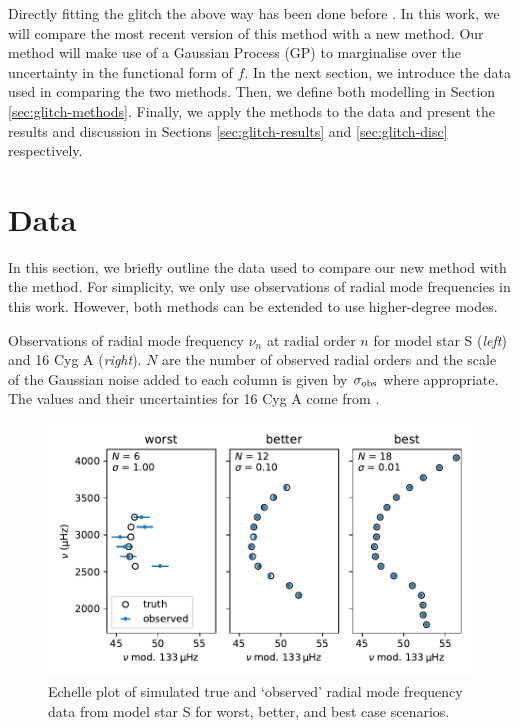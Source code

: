 
Directly fitting the glitch the above way has been done before \citep[e.g.][]{Verma.Faria.ea2014,Verma.Raodeo.ea2017,Mazumdar.Monteiro.ea2014}. In this work, we will compare the most recent version of this method \citep[][hereafter V19]{Verma.Raodeo.ea2019} with a new method. Our method will make use of a Gaussian Process (GP) to marginalise over the uncertainty in the functional form of \(f\). In the next section, we introduce the data used in comparing the two methods. Then, we define both modelling in Section \ref{sec:glitch-methods}. Finally, we apply the methods to the data and present the results and discussion in Sections \ref{sec:glitch-results} and \ref{sec:glitch-disc} respectively.

\section{Data}\label{sec:glitch-data}

In this section, we briefly outline the data used to compare our new method with the  method. For simplicity, we only use observations of radial mode frequencies in this work. However, both methods can be extended to use higher-degree modes.

\begin{table}
    \centering
    \caption[Observations of radial mode frequency \(\nu_n\) at radial order \(n\) for model star S and 16 Cyg A.]{Observations of radial mode frequency \(\nu_n\) at radial order \(n\) for model star S (\emph{left}) and 16 Cyg A (\emph{right}). \(N\) are the number of observed radial orders and the scale of the Gaussian noise added to each column is given by \(\sigma_{{\mathrm{obs}}}\) where appropriate. The values and their uncertainties for 16 Cyg A come from \citet{Lund.SilvaAguirre.ea2017}.}
    \label{tab:glitch-obs}
    
\end{table}

\begin{figure}[tb]
    \centering
    \includegraphics{figures/glitch-test-obs.pdf}
    \caption{Echelle plot of simulated true and `observed' radial mode frequency data from model star S for worst, better, and best case scenarios.}
    \label{fig:glitch-test-obs}
\end{figure}

